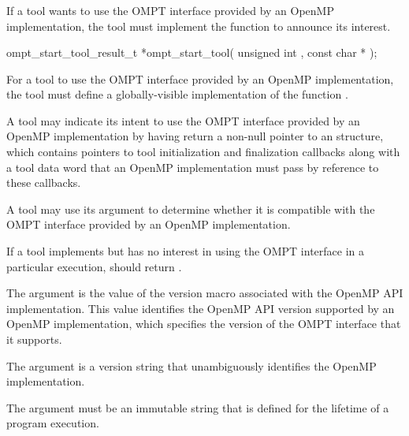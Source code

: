 \subsubsection{}
\label{sec:ompt_start_tool}

\summary
If a tool wants to use the OMPT interface provided by an OpenMP implementation,
the tool must implement the function  to announce its interest.

\format

\begin{cspecific}
\begin{omptOther}
ompt_start_tool_result_t *ompt_start_tool(
  unsigned int ,
  const char *
);
\end{omptOther}
\end{cspecific}


\descr
For a tool to use the OMPT interface provided by an OpenMP implementation,
the tool must define a globally-visible implementation of the
function .

A tool may indicate its intent to use the OMPT interface provided
by an OpenMP implementation by having
 return a non-null pointer to an
 structure, which contains pointers to
tool initialization and finalization callbacks along with
a tool data word that an OpenMP implementation must pass by reference
to these callbacks.

A tool may use its argument  to determine
whether it is compatible with the OMPT interface provided by an OpenMP
implementation.

If a tool implements  but has no interest in using
the OMPT interface in a particular execution,
 should return .

\argdesc

The argument 
is the value of the  version macro
associated with the OpenMP API implementation. This value
identifies the OpenMP API version supported by an OpenMP implementation,
which specifies the version of the OMPT interface that it supports.

The argument 
is a version string that unambiguously identifies the OpenMP implementation.

\constraints

The argument  must be
an immutable string that is defined for the lifetime of a program
execution.

